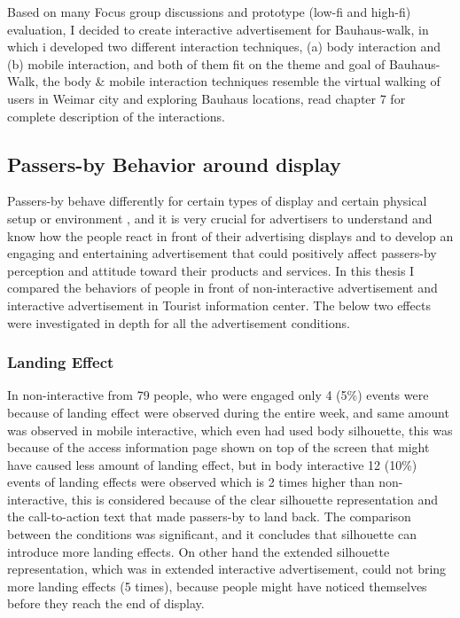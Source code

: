 Based on many Focus group discussions and prototype (low-fi and high-fi) evaluation, I decided to create interactive advertisement for Bauhaus-walk, in which i developed two different interaction techniques, (a) body interaction and (b) mobile interaction, and both of them fit on the theme and goal of Bauhaus-Walk, the body \& mobile interaction techniques resemble the virtual walking of users in Weimar city and exploring Bauhaus locations, read chapter 7 for complete description of the interactions.


\subsection{Passers-by Behavior around display}
Passers-by behave differently for certain types of display\cite{CylindricalScreen}   and certain physical setup or environment \cite{chained_displays, LookingGlass}, and it is very crucial for advertisers to understand and know how the people react in front of their advertising displays and to develop an engaging and entertaining advertisement that could positively affect passers-by perception and attitude toward their products and services. In this thesis I compared the behaviors of people in front of non-interactive advertisement and interactive advertisement in Tourist information center. The below two effects were investigated in depth for all the advertisement conditions.

\subsubsection{Landing Effect}
In non-interactive from 79 people, who were engaged only 4 (5\%) events were because of landing effect were observed during the entire week, and same amount was observed in mobile interactive, which even had used body silhouette, this was because of the access information page shown on top of the screen that might have caused less amount of landing effect, but in body interactive 12 (10\%) events of landing effects were observed which is 2 times higher than non-interactive, this is considered because of the clear silhouette representation and the call-to-action text that made passers-by to land back. The comparison between the conditions was significant, and it concludes that silhouette can introduce more landing effects. On other hand the extended silhouette representation, which was in extended interactive advertisement, could not bring more landing effects (5 times), because people might have noticed themselves before they reach the end of display.

